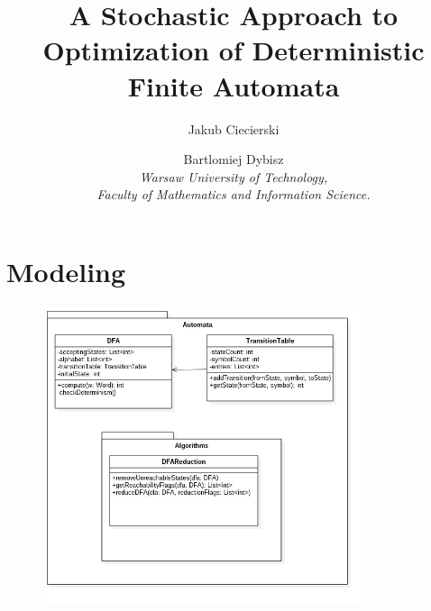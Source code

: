 \documentclass[runningheads, a4paper]{llncs}
\begin{document}
\mainmatter  %

\title{A Stochastic Approach to Optimization of Deterministic Finite Automata}


\author{Jakub Ciecierski \and Bartlomiej Dybisz \\ 
\textit{Warsaw University of Technology, \\
Faculty of Mathematics and Information Science.}}
%

\maketitle

\section{Modeling}

\begin{figure}[h]
    \includegraphics[width=0.85\textwidth]{res/uml/classes/automata.jpg}
\end{figure}
\end{document}
